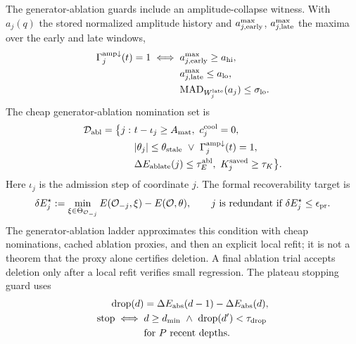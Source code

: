 \documentclass[
  reprint,
  amsmath,
  amssymb,
  aps,
  pra,
  nofootinbib,
  superscriptaddress,
  floatfix
]{revtex4-2}
\newcommand{\Oset}{\mathcal{O}}
\newcommand{\Dcal}{\mathcal{D}}
\begin{document}
The generator-ablation guards include an amplitude-collapse witness. With $a_j(q)$ the stored normalized amplitude history and $a_{j,\rm early}^{\max}$, $a_{j,\rm late}^{\max}$ the maxima over the early and late windows,
\begin{equation}
\begin{aligned}
\Gamma_j^{\rm amp\downarrow}(t)=1
\iff{}&
a_{j,\rm early}^{\max}\ge a_{\rm hi},\\
&a_{j,\rm late}^{\max}\le a_{\rm lo},\\
&{\rm MAD}_{W_j^{\rm late}}(a_j)\le \sigma_{\rm lo}.
\end{aligned}
\label{eq:amp_collapse_witness}
\end{equation}
The cheap generator-ablation nomination set is
\begin{equation}
\begin{aligned}
\Dcal_{\rm abl}=\bigl\{j:\ &t-\iota_j\ge A_{\rm mat},\ c_j^{\rm cool}=0,\\
&|\theta_j|\le \theta_{\rm stale}\ \vee\ \Gamma_j^{\rm amp\downarrow}(t)=1,\\
&\Delta E_{\rm ablate}(j)\le \tau_E^{\rm abl},\ K_j^{\rm saved}\ge \tau_K\bigr\}.
\end{aligned}
\label{eq:static_ablation_candidates}
\end{equation}
Here $\iota_j$ is the admission step of coordinate $j$. The formal recoverability target is
\begin{equation}
\delta E_j^\star
:=
\min_{\xi\in\Theta_{\Oset_{-j}}}
E(\Oset_{-j},\xi)
-
E(\Oset,\theta),
\qquad
j\ \text{is redundant if}\ \delta E_j^\star\le\epsilon_{\rm pr}.
\label{eq:static_ablation_recoverability}
\end{equation}
The generator-ablation ladder approximates this condition with cheap nominations, cached ablation proxies, and then an explicit local refit; it is not a theorem that the proxy alone certifies deletion. A final ablation trial accepts deletion only after a local refit verifies small regression. The plateau stopping guard uses
\begin{equation}
\begin{aligned}
{\rm drop}(d)&=\Delta E_{\rm abs}(d-1)-\Delta E_{\rm abs}(d),\\
{\rm stop}\iff{}&d\ge d_{\min}\ \wedge\ {\rm drop}(d')<\tau_{\rm drop}\\
&\text{for } P\ \text{recent depths}.
\end{aligned}
\label{eq:plateau_stop}
\end{equation}
\end{document}
